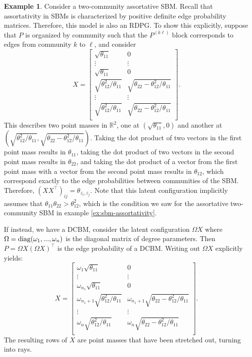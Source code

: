\documentclass[
  12pt,
]{article}
\theoremstyle{definition}
\theoremstyle{definition}
\newtheorem{example}{Example}[section]
\theoremstyle{definition}
\theoremstyle{definition}
\theoremstyle{remark}
\begin{document}
\begin{example}
Consider a two-community assortative SBM. 
Recall that assortativity in SBMs is characterized by positive definite edge probability matrices. 
Therefore, this model is also an RDPG. 
To show this explicitly, suppose that $P$ is organized by community such that the $P^{(k \ell)}$ block corresponds to edges from community $k$ to $\ell$, and consider 
$$X = \begin{bmatrix}
\sqrt{\theta_{11}} & 0 \\ 
\vdots & \vdots \\ 
\sqrt{\theta_{11}} & 0 \\ 
\sqrt{\theta_{12}^2 / \theta_{11}} & \sqrt{\theta_{22} - \theta_{12}^2 / \theta_{11}} \\ 
\vdots & \vdots \\
\sqrt{\theta_{12}^2 / \theta_{11}} & \sqrt{\theta_{22} - \theta_{12}^2 / \theta_{11}} \\ 
\end{bmatrix}.$$
This describes two point masses in $\mathbb{R}^2$, one at $(\sqrt{\theta_{11}}, 0)$ and another at $(\sqrt{\theta_{12}^2 / \theta_{11}}, \sqrt{\theta_{22} - \theta_{12}^2 / \theta_{11}})$. 
Taking the dot product of two vectors in the first point mass results in $\theta_{11}$, taking the dot product of two vectors in the second point mass results in $\theta_{22}$, and taking the dot product of a vector from the first point mass with a vector from the second point mass results in $\theta_{12}$, which correspond exactly to the edge probabilities between communities of the SBM. 
Therefore, $(X X^\top)_{ij} = \theta_{z_i, z_j}$. 
Note that this latent configuration implicitly assumes that $\theta_{11} \theta_{22} > \theta_{12}^2$, which is the condition we saw for the assortative two-community SBM in example \ref{ex:sbm-assortativity}.

If instead, we have a DCBM, consider the latent configuration $\Omega X$ where $\Omega = \mathrm{diag}(\omega_1, ..., \omega_n)$ is the diagonal matrix of degree parameters. 
Then $P = \Omega X (\Omega X)^\top$ is the edge probability of a DCBM. 
Writing out $\Omega X$ explicitly yields:
$$X = \begin{bmatrix}
\omega_1 \sqrt{\theta_{11}} & 0 \\ 
\vdots & \vdots \\ 
\omega_{n_1} \sqrt{\theta_{11}} & 0 \\ 
\omega_{n_1 + 1} \sqrt{\theta_{12}^2 / \theta_{11}} & \omega_{n_1 + 1} \sqrt{\theta_{22} - \theta_{12}^2 / \theta_{11}} \\ 
\vdots & \vdots \\
\omega_n \sqrt{\theta_{12}^2 / \theta_{11}} & \omega_n \sqrt{\theta_{22} - \theta_{12}^2 / \theta_{11}} \\ 
\end{bmatrix}.$$
The resulting rows of $X$ are point masses that have been stretched out, turning into rays. 
\end{example}
\end{document}
